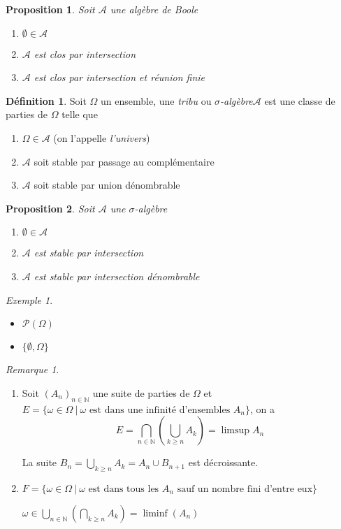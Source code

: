 \documentclass[]{article}
\newtheorem{myproposition}{Proposition}
\theoremstyle{remark}
\newtheorem{myrem}{Remarque}
\newtheorem{myexmpl}{Exemple}
\theoremstyle{definition}
\newtheorem{mydef}{Définition}
\begin{document}
\begin{myproposition}
	Soit $\mathcal{A}$ une algèbre de Boole
	\begin{enumerate}
		\item $\emptyset \in \mathcal{A}$
		\item $\mathcal{A}$ est clos par intersection
		\item $\mathcal{A}$ est clos par intersection et réunion finie
	\end{enumerate}
\end{myproposition}

\begin{mydef}
	Soit $\Omega$ un ensemble, une \textit{tribu} ou \textit{$\sigma$-algèbre}$\mathcal{A}$ est une classe de parties de $\Omega$ telle que
	\begin{enumerate}
		\item $\Omega \in \mathcal{A}$ (on l'appelle \textit{l'univers})
		\item $\mathcal{A}$ soit stable par passage au complémentaire
		\item $\mathcal{A}$ soit stable par union dénombrable
	\end{enumerate}
\end{mydef}

\begin{myproposition}
	Soit $\mathcal{A}$ une $\sigma$-algèbre
	\begin{enumerate}
		\item $\emptyset \in \mathcal{A}$
		\item $\mathcal{A}$ est stable par intersection
		\item $\mathcal{A}$ est stable par intersection dénombrable
	\end{enumerate}
\end{myproposition}

\begin{myexmpl}
	\leavevmode
	\begin{itemize}
		\item $\mathcal{P}(\Omega)$
		\item $\{\emptyset, \Omega\}$
	\end{itemize}
\end{myexmpl}

\begin{myrem}
	\leavevmode
	\begin{enumerate}
		\item Soit $(A_n)_{n \in \mathbb{N}}$ une suite de parties de $\Omega$ et $E = \{\omega \in \Omega ~ | ~ \omega \text{ est dans une infinité d'ensembles $A_n$} \}$, on a
		$$E = \bigcap_{n \in \mathbb{N}} \left(\bigcup_{k \geqslant n} A_k\right) = \limsup A_n$$
		
		La suite $\displaystyle B_n = \bigcup_{k \geqslant n} A_k = A_n \cup B_{n+1}$ est décroissante.
		
		\item $F = \{\omega \in \Omega ~ | ~ \text{$\omega$ est dans tous les $A_n$ sauf un nombre fini d'entre eux} \}$
		
		$\displaystyle \omega \in \bigcup_{n \in \mathbb{N}} \left(\bigcap_{k \geqslant n} A_k \right) = \liminf (A_n)$
	\end{enumerate}
\end{myrem}
\end{document}
